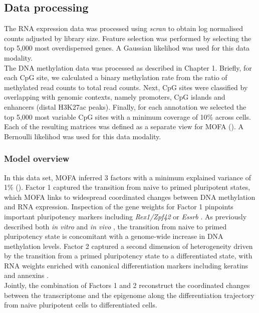 \subsection{Data processing}

The RNA expression data was processed using \textit{scran}\cite{Lun2016b} to obtain log normalised counts adjusted by library size. Feature selection was performed by selecting the top 5,000 most overdispersed genes\cite{Lun2016a}. A Gaussian likelihod was used for this data modality. \\
The DNA methylation data was processed as described in Chapter 1. Briefly, for each CpG site, we calculated a binary methylation rate from the ratio of methylated read counts to total read counts. Next, CpG sites were classified by overlapping with genomic contexts, namely promoters, CpG islands and enhancers (distal H3K27ac peaks). Finally, for each annotation we selected the top 5,000 most variable CpG sites with a minimum coverage of 10\% across cells. Each of the resulting matrices was defined as a separate view for MOFA (). A Bernoulli likelihod was used for this data modality.


\subsubsection{Model overview}

In this data set, MOFA inferred 3 factors with a minimum explained variance of 1\% (). Factor 1 captured the transition from naive to primed pluripotent states, which MOFA links to widespread coordinated changes between DNA methylation and RNA expression. Inspection of the gene weights for Factor 1 pinpoints important pluripotency markers including  \textit{Rex1/Zpf42} or \textit{Essrb} \cite{Mohammed2017}. As previously described both \textit{in vitro} \cite{Angermueller2016} and \textit{in vivo} \cite{Auclair2014}, the transition from naive to primed pluripotency state is concomitant with a genome-wide increase in DNA methylation levels. Factor 2 captured a second dimension of heterogeneity driven by the transition from a primed pluripotency state to a differentiated state, with RNA weights enriched with canonical differentiation markers including keratins and annexins \cite{Fuchs1988}.\\
Jointly, the combination of Factors 1 and 2 reconstruct the coordinated changes between the transcriptome and the epigenome along the differentiation trajectory from naive pluripotent cells to differentiated cells.


